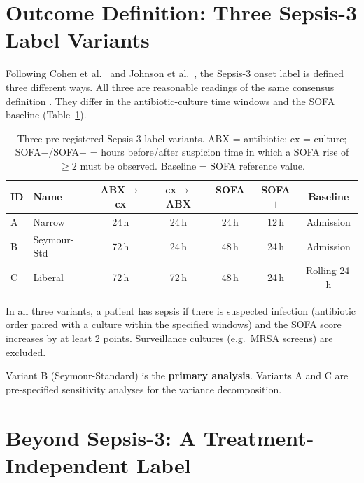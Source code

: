\section{Outcome Definition: Three Sepsis-3 Label Variants}
\label{sec:label_variants}

Following Cohen et al.\ \cite{cohen2024subtle} and Johnson et al.\
\cite{johnson2018comparative}, the Sepsis-3 onset label is defined three
different ways. All three are reasonable readings of the same consensus
definition \cite{singer2016sepsis3}. They differ in the
antibiotic-culture time windows and the SOFA baseline
(Table~\ref{tab:label_variants}).

\begin{table}[H]
    \centering\small
    \begin{tabular}{llccccc}
        \toprule
        \textbf{ID} & \textbf{Name} & \textbf{ABX$\to$cx} & \textbf{cx$\to$ABX}
        & \textbf{SOFA$-$} & \textbf{SOFA$+$} & \textbf{Baseline} \\
        \midrule
        A & Narrow      & 24\,h & 24\,h & 24\,h & 12\,h & Admission     \\
        B & Seymour-Std & 72\,h & 24\,h & 48\,h & 24\,h & Admission     \\
        C & Liberal     & 72\,h & 72\,h & 48\,h & 24\,h & Rolling 24\,h \\
        \bottomrule
    \end{tabular}
    \caption{Three pre-registered Sepsis-3 label variants. ABX = antibiotic;
    cx = culture; SOFA$-$/SOFA$+$ = hours before/after suspicion time in which
    a SOFA rise of $\geq 2$ must be observed. Baseline = SOFA reference value.}
    \label{tab:label_variants}
\end{table}

In all three variants, a patient has sepsis if there is suspected infection
(antibiotic order paired with a culture within the specified windows) and the
SOFA score increases by at least 2 points. Surveillance cultures (e.g.\ MRSA
screens) are excluded.

Variant B (Seymour-Standard) is the \textbf{primary analysis}. Variants A and C
are pre-specified sensitivity analyses for the variance decomposition.


\section{Beyond Sepsis-3: A Treatment-Independent Label}
\label{sec:alt_labels}

